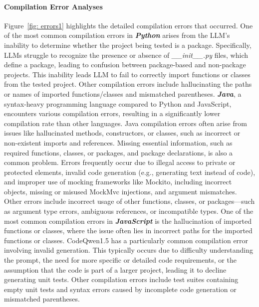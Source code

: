 \paragraph{Compilation Error Analyses}
% 
Figure~\ref{fig: errors1} highlights the detailed compilation errors that occurred.
One of the most common compilation errors in \textbf{\textit{Python}} arises from the LLM's inability to determine whether the project being tested is a package. Specifically, LLMs struggle to recognize the presence or absence of \textit{\_\_init\_\_.py} files, which define a package, leading to confusion between package-based and non-package projects. This inability leads LLM to fail to correctly import functions or classes from the tested project.
Other compilation errors include hallucinating the paths or names of imported functions/classes and mismatched parentheses.
\textbf{\textit{Java}}, a syntax-heavy programming language compared to Python and JavaScript, encounters various compilation errors, resulting in a significantly lower compilation rate than other languages. Java compilation errors often arise from issues like hallucinated methods, constructors, or classes, such as incorrect or non-existent imports and references. Missing essential information, such as required functions, classes, or packages, and package declarations, is also a common problem. Errors frequently occur due to illegal access to private or protected elements, invalid code generation (e.g., generating text instead of code), and improper use of mocking frameworks like Mockito, including incorrect objects, missing or misused MockMvc injections, and argument mismatches. Other errors include incorrect usage of other functions, classes, or packages—such as argument type errors, ambiguous references, or incompatible types.
One of the most common compilation errors in \textbf{\textit{JavaScript}} is the hallucination of imported functions or classes, where the issue often lies in incorrect paths for the imported functions or classes. CodeQwen1.5 has a particularly common compilation error involving invalid generation. This typically occurs due to difficulty understanding the prompt, the need for more specific or detailed code requirements, or the assumption that the code is part of a larger project, leading it to decline generating unit tests. Other compilation errors include test suites containing empty unit tests and syntax errors caused by incomplete code generation or mismatched parentheses.


